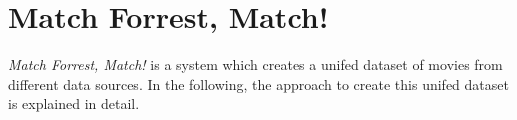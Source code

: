 \section{Match Forrest, Match!}
\label{sec_method}

\emph{Match Forrest, Match!} is a system which creates a unifed dataset of movies from different data sources.
In the following, the approach to create this unifed dataset is explained in detail.






